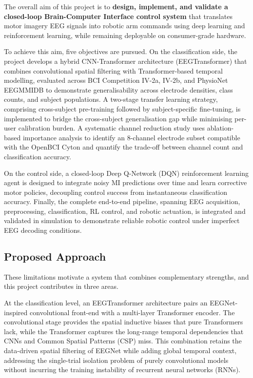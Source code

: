 \documentclass[12pt, a4paper]{article}
\begin{document}
The overall aim of this project is to \textbf{design, implement, and validate a closed-loop Brain-Computer Interface control system} that translates motor imagery EEG signals into robotic arm commands using deep learning and reinforcement learning, while remaining deployable on consumer-grade hardware.

To achieve this aim, five objectives are pursued. On the classification side, the project develops a hybrid CNN-Transformer architecture (EEGTransformer) that combines convolutional spatial filtering with Transformer-based temporal modelling, evaluated across BCI Competition IV-2a, IV-2b, and PhysioNet EEGMMIDB to demonstrate generalisability across electrode densities, class counts, and subject populations. A two-stage transfer learning strategy, comprising cross-subject pre-training followed by subject-specific fine-tuning, is implemented to bridge the cross-subject generalisation gap while minimising per-user calibration burden. A systematic channel reduction study uses ablation-based importance analysis to identify an 8-channel electrode subset compatible with the OpenBCI Cyton and quantify the trade-off between channel count and classification accuracy.

On the control side, a closed-loop Deep Q-Network (DQN) reinforcement learning agent is designed to integrate noisy MI predictions over time and learn corrective motor policies, decoupling control success from instantaneous classification accuracy. Finally, the complete end-to-end pipeline, spanning EEG acquisition, preprocessing, classification, RL control, and robotic actuation, is integrated and validated in simulation to demonstrate reliable robotic control under imperfect EEG decoding conditions.

\subsection{Proposed Approach}

These limitations motivate a system that combines complementary strengths, and this project contributes in three areas.

At the classification level, an EEGTransformer architecture pairs an EEGNet-inspired convolutional front-end with a multi-layer Transformer encoder. The convolutional stage provides the spatial inductive biases that pure Transformers lack, while the Transformer captures the long-range temporal dependencies that CNNs and Common Spatial Patterns (CSP) miss. This combination retains the data-driven spatial filtering of EEGNet while adding global temporal context, addressing the single-trial isolation problem of purely convolutional models without incurring the training instability of recurrent neural networks (RNNs).
\end{document}
